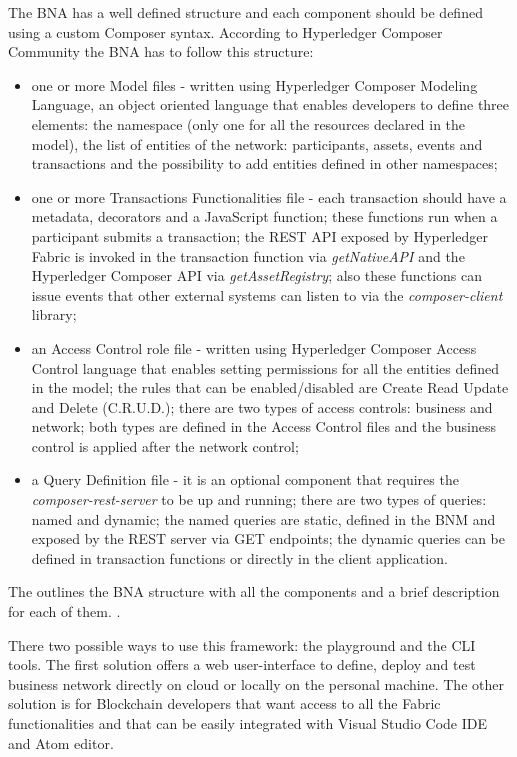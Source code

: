 The BNA has a well defined structure and each component should be defined using a custom Composer syntax.
According to Hyperledger Composer Community \cite{composer-wiki} the BNA has to follow this structure:
\begin{itemize}
	\item one or more Model files - written using Hyperledger Composer Modeling Language, an object oriented language that enables developers to define three elements: the namespace (only one for all the resources declared in the model), the list of entities of the network: participants, assets, events and transactions and the possibility to add entities defined in other namespaces;
	\item one or more Transactions Functionalities file - each transaction should have a metadata, decorators and a JavaScript function; these functions run when a participant submits a transaction; the REST API exposed by Hyperledger Fabric is invoked in the transaction function via \emph{getNativeAPI} and the Hyperledger Composer API via \emph{getAssetRegistry}; also these functions can issue events that other external systems can listen to via the \emph{composer-client} library;
	\item an Access Control role file -  written using Hyperledger Composer Access Control language that enables setting permissions for all the entities defined in the model; the rules that can be enabled/disabled are Create Read Update and Delete (C.R.U.D.); there are two types of access controls: business and network; both types are defined in the Access Control files and the business control  is applied after the network control;
	\item a Query Definition file - it is an optional component that requires the \emph{composer-rest-server} to be up and running; there are two types of queries: named and dynamic; the named queries are static, defined in the BNM and exposed by the REST server via GET endpoints; the dynamic queries can be defined in transaction functions or directly in the client application.
\end{itemize}  
The  outlines the BNA structure with all the components and a brief description for each of them.
.

There two possible ways to use this framework: the playground and the CLI tools. The first solution offers a web user-interface to define, deploy and test business network directly on cloud or locally on the personal machine. The other solution is for Blockchain developers that want access to all the Fabric functionalities and that can be easily integrated with Visual Studio Code IDE and Atom editor.

